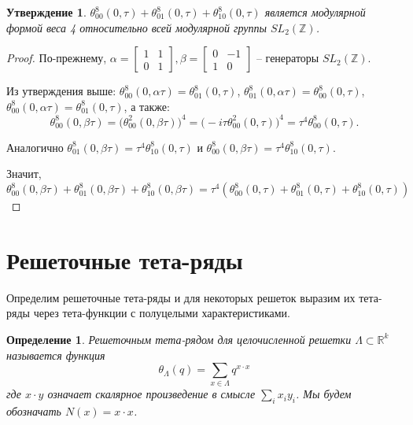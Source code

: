 \documentclass{article}
\newcommand{\ZZ}{\mathbb{Z}}
\newcommand{\RR}{\mathbb{R}}
\theoremstyle{break}
\newtheorem{definition}[theorem]{Определение}
\newtheorem{claim}{Утверждение}[section]
\begin{document}
\begin{claim}
	$\theta_{00}^8(0, \tau) + \theta_{01}^8(0, \tau) + \theta_{10}^8(0, \tau)$ является модулярной формой веса 4 относительно всей модулярной группы $SL_2(\ZZ)$.
\end{claim}

\begin{proof}
	
	По-прежнему, $\alpha=\begin{bmatrix}
		1 & 1 \\ 0 & 1
	\end{bmatrix}, \beta=\begin{bmatrix}
		0 & -1 \\ 1 & 0
	\end{bmatrix}$ -- генераторы $SL_2(\ZZ)$.

	Из утверждения выше: 
	$\theta_{00}^8(0, \alpha\tau)=\theta_{01}^8(0, \tau)$, 
	$\theta_{01}^8(0, \alpha\tau)=\theta_{00}^8(0, \tau)$,
	$\theta_{00}^8(0, \alpha\tau)=\theta_{01}^8(0, \tau)$, 
	а также:
	\begin{equation}
	\theta_{00}^8(0, \beta \tau)=
	\Big( \theta_{00}^2(0, \beta \tau) \Big)^4=
	\Big( -i\tau\theta_{00}^2(0, \tau) \Big)^4=
	\tau^4\theta_{00}^8(0, \tau).
	\end{equation}
	
	Аналогично $\theta_{01}^8(0, \beta\tau)=\tau^4\theta_{10}^8(0, \tau)$ и
	$\theta_{00}^8(0, \beta \tau)=\tau^4\theta_{10}^8(0, \tau)$.

	Значит,
	\begin{equation}
	\theta_{00}^8(0, \beta \tau) 
	+ \theta_{01}^8(0, \beta \tau)
	+ \theta_{10}^8(0, \beta \tau)=
	\tau^4(\theta_{00}^8(0, \tau) + \theta_{01}^8(0, \tau) + \theta_{10}^8(0, \tau))
	\end{equation}
	
\end{proof}

\section{Решеточные тета-ряды}
Определим решеточные тета-ряды и для некоторых решеток выразим их тета-ряды через 
тета-функции с полуцелыми характеристиками.
\begin{definition}
	Решеточным тета-рядом для целочисленной решетки $\Lambda \subset \RR^k$ называется функция
	\begin{equation}
		\theta_{\Lambda}(q)=\sum_{x \in \Lambda} q^{x \cdot x}
	\end{equation}
	где $x \cdot y$ означает скалярное произведение в смысле $\sum_{i} x_i y_i$. 
	Мы будем обозначать $N(x) = x \cdot x$.
\end{definition}
\end{document}
